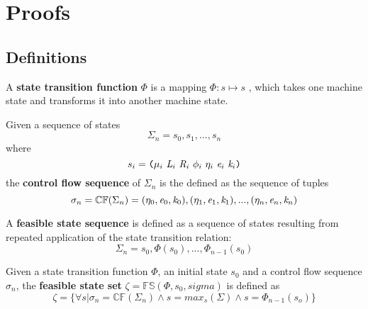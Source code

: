 \section{Proofs}

\subsection{Definitions}

\begin{definition}
A \textbf{state transition function} $\Phi$ is a mapping $\Phi : s \mapsto s$ , which takes one machine state and transforms it into another machine state.
\end{definition}

\begin{definition}
Given a sequence of states $$\Sigma_n = s_0,s_1,...,s_n$$ where $$s_i = \lp \mu_i\ \cfgnt{L}_i\ \cfgnt{R}_i\ \phi_i\ \eta_i\ \cfgnt{e}_i\ \cfgnt{k}_i\rp$$ the \textbf{control flow sequence} of $\Sigma_n$ is the defined as the sequence of tuples $$ \sigma_n = \mathbb{CF}(\Sigma_n) = (\eta_0,\emph{e}_0,\emph{k}_0),(\eta_1,\emph{e}_1,\emph{k}_1),...,(\eta_n,\emph{e}_n,\emph{k}_n)$$
\end{definition}

\begin{definition}
A \textbf{feasible state sequence} is defined as a sequence of states resulting from repeated application of the state transition relation: $$ \Sigma_n = s_0, \Phi (s_0) ,..., \Phi_{n-1} (s_0) $$
\end{definition}

\begin{definition}
Given a state transition function $\Phi$, an initial state $s_0$ and a control flow sequence $\sigma_n$, the \textbf{feasible state set} $\zeta = \mathbb{FS}(\Phi,s_0,sigma)$ is defined as
 $$\zeta = \{ \forall s | \sigma_n = \mathbb{CF}(\Sigma_n) \wedge s = max_s(\Sigma) \wedge s = \Phi_{n-1}(s_o)\} $$
\end{definition}

